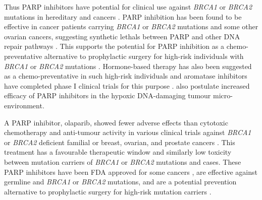 Thus \gls{PARP} inhibitors have potential for clinical use against \textit{BRCA1} or \textit{BRCA2} \glspl{mutation} in \gls{hereditary} and  cancers \citep{Ashworth2008, Kaelin2005}. \gls{PARP} inhibition has been found to be effective in cancer patients carrying \textit{BRCA1} or \textit{BRCA2} \glspl{mutation} and some other ovarian cancers, suggesting \glspl{synthetic lethal} between \gls{PARP} and other \acrshort{DNA} repair \glspl{pathway} \citep{Strom2012}. This supports the potential for \gls{PARP} inhibition as a chemo-preventative alternative to prophylactic surgery for high-risk individuals with \textit{BRCA1} or \textit{BRCA2} \glspl{mutation} \citep{Strom2012}. Hormone-based therapy has also been suggested as a chemo-preventative in such high-risk individuals and aromatase inhibitors have completed phase I clinical trials for this purpose \citep{Bozovic-Spasojevic2012}. \citet{Strom2012} also postulate increased efficacy of \gls{PARP} inhibitors in the hypoxic \acrshort{DNA}-damaging tumour micro-environment.  

A \gls{PARP} inhibitor, olaparib, showed fewer adverse effects than cytotoxic \gls{chemotherapy} and anti-tumour activity in various clinical trials against \textit{BRCA1} or \textit{BRCA2} deficient \gls{familial} or  breast, ovarian, and prostate cancers \citep{Fong2009, Fong2010, Tutt2010, Audeh2010}. 
This treatment has a favourable therapeutic window and similarly low toxicity between \gls{mutation} carriers of \textit{BRCA1} or \textit{BRCA2} \glspl{mutation} and  cases. 
These \gls{PARP} inhibitors have been FDA approved for some cancers \cite{McLachlan2016}, are effective against \gls{germline} and  \textit{BRCA1} or \textit{BRCA2} \glspl{mutation}, and are a potential prevention alternative to prophylactic surgery for high-risk \gls{mutation} carriers \cite{Strom2012}. 

